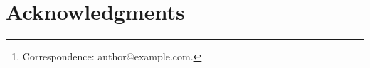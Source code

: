 \documentclass[10pt,twocolumn]{article}
\title{\papertitle}
\author{Anonymous Authors}
\author{First Author\thanks{Correspondence: author@example.com.}
    \quad Second Author\\Institution Name}
\date{}
\newif\ifanonymous
\begin{document}
\maketitle

\begin{abstract}
Describe the problem and why it matters. State the limitation of existing
approaches, summarize the proposed idea, and report the main empirical or
theoretical finding once available. Close with the implication and scope
of the result. This paragraph is a writing prompt, not a research claim.
\end{abstract}







\ifanonymous\else
\section*{Acknowledgments}
\fi




\clearpage
\appendix

\end{document}
